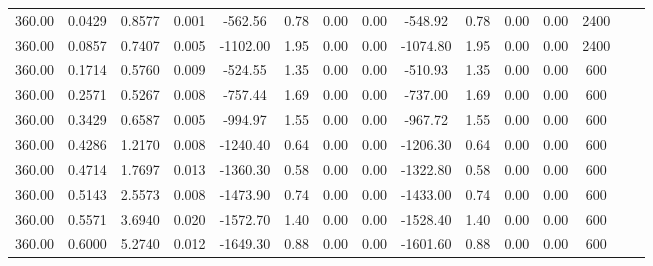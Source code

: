 \documentclass[%
 aip,
 jcp,
 sd,%
 amsmath,amssymb,
]{revtex4-1}
\begin{document}
\begin{table}[!htbp]
\begin{ruledtabular}
\begin{tabular}{ccccccccccccccc}
360.00 & 0.0429 & 0.8577  & 0.001 & -562.56  & 0.78 & 0.00 & 0.00 & -548.92  & 0.78 & 0.00 & 0.00 & 2400 \\
360.00 & 0.0857 & 0.7407  & 0.005 & -1102.00 & 1.95 & 0.00 & 0.00 & -1074.80 & 1.95 & 0.00 & 0.00 & 2400 \\
360.00 & 0.1714 & 0.5760  & 0.009 & -524.55  & 1.35 & 0.00 & 0.00 & -510.93  & 1.35 & 0.00 & 0.00 & 600  \\
360.00 & 0.2571 & 0.5267  & 0.008 & -757.44  & 1.69 & 0.00 & 0.00 & -737.00  & 1.69 & 0.00 & 0.00 & 600  \\
360.00 & 0.3429 & 0.6587  & 0.005 & -994.97  & 1.55 & 0.00 & 0.00 & -967.72  & 1.55 & 0.00 & 0.00 & 600  \\
360.00 & 0.4286 & 1.2170  & 0.008 & -1240.40 & 0.64 & 0.00 & 0.00 & -1206.30 & 0.64 & 0.00 & 0.00 & 600  \\
360.00 & 0.4714 & 1.7697  & 0.013 & -1360.30 & 0.58 & 0.00 & 0.00 & -1322.80 & 0.58 & 0.00 & 0.00 & 600  \\
360.00 & 0.5143 & 2.5573  & 0.008 & -1473.90 & 0.74 & 0.00 & 0.00 & -1433.00 & 0.74 & 0.00 & 0.00 & 600  \\
360.00 & 0.5571 & 3.6940  & 0.020 & -1572.70 & 1.40 & 0.00 & 0.00 & -1528.40 & 1.40 & 0.00 & 0.00 & 600  \\
360.00 & 0.6000 & 5.2740  & 0.012 & -1649.30 & 0.88 & 0.00 & 0.00 & -1601.60 & 0.88 & 0.00 & 0.00 & 600
\end{tabular}
\end{ruledtabular}
\end{table}
\end{document}

